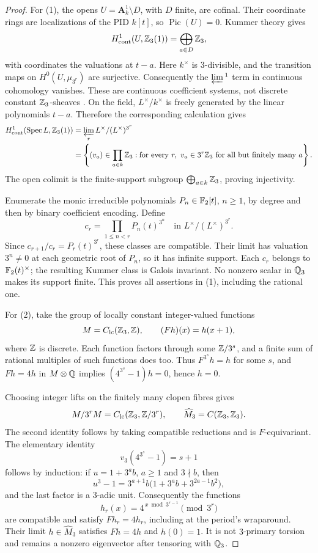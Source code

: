 \begin{proof}
For (1), the opens \(U=\mathbf A^1_k\setminus D\), with \(D\) finite,
are cofinal.  Their coordinate rings are localizations of the PID
\(k[t]\), so \(\operatorname{Pic}(U)=0\).  Kummer theory gives
\[
 H^1_{\mathrm{cont}}(U,\mathbb Z_3(1))
   =\bigoplus_{a\in D}\mathbb Z_3,
\]
with coordinates the valuations at \(t-a\).  Here \(k^\times\) is
\(3\)-divisible, and the transition maps on
\(H^0(U,\mu_{3^r})\) are surjective.  Consequently the
\(\varprojlim{}^1\) term in continuous cohomology vanishes.  These are
continuous coefficient systems, not discrete constant
\(\mathbb Z_3\)-sheaves
\cite[(3.1), Theorem~3.2 and (3.27), pp.~216--217, 222]{BJannsen1988}.
On the field, \(L^\times/k^\times\) is freely generated by the linear
polynomials \(t-a\).  Therefore the corresponding calculation gives
\[
\begin{split}
 H^1_{\mathrm{cont}}(\operatorname{Spec} L,\mathbb Z_3(1))
 &=\varprojlim_r L^\times/(L^\times)^{3^r}\\
 &=\left\{(v_a)\in\prod_{a\in k}\mathbb Z_3:
       \text{for every }r,\ v_a\in3^r\mathbb Z_3
       \text{ for all but finitely many }a\right\}.
\end{split}
\]
The open colimit is the finite-support subgroup
\(\bigoplus_{a\in k}\mathbb Z_3\), proving injectivity.

Enumerate the monic irreducible polynomials \(P_n\in\mathbb F_2[t]\),
\(n\geq1\), by degree and then by binary coefficient encoding.  Define
\[
 c_r=\prod_{1\leq n<r}P_n(t)^{3^n}
       \quad\text{in }L^\times/(L^\times)^{3^r}.
\]
Since \(c_{r+1}/c_r=P_r(t)^{3^r}\), these classes are compatible.
Their limit has valuation \(3^n\ne0\) at each geometric root of
\(P_n\), so it has infinite support.  Each \(c_r\) belongs to
\(\mathbb F_2(t)^\times\); the resulting Kummer class is Galois invariant.
No nonzero scalar in \(\mathbb Q_3\) makes its support finite.  This proves
all assertions in (1), including the rational one.

For (2), take the group of locally constant integer-valued functions
\[
 M=C_{\mathrm{lc}}(\mathbb Z_3,\mathbb Z),\qquad (Fh)(x)=h(x+1),
\]
where \(\mathbb Z\) is discrete.  Each function factors through some
\(\mathbb Z/3^s\), and a finite sum of rational multiples of such functions
does too.  Thus \(F^{3^s}h=h\) for some \(s\), and
\(Fh=4h\) in \(M\otimes\mathbb Q\) implies
\((4^{3^s}-1)h=0\), hence \(h=0\).

Choosing integer lifts on the finitely many clopen fibres gives
\[
 M/3^rM=C_{\mathrm{lc}}(\mathbb Z_3,\mathbb Z/3^r),\qquad
 \widehat M_3=C(\mathbb Z_3,\mathbb Z_3).
\]
The second identity follows by taking compatible reductions and is
\(F\)-equivariant.  The elementary identity
\[
 v_3(4^{3^s}-1)=s+1
\]
follows by induction: if \(u=1+3^a b\), \(a\geq1\) and \(3\nmid b\),
then
\[
 u^3-1=3^{a+1}b\bigl(1+3^a b+3^{2a-1}b^2\bigr),
\]
and the last factor is a \(3\)-adic unit.  Consequently the functions
\[
 h_r(x)=4^{\,x\bmod 3^{r-1}}\pmod{3^r}
\]
are compatible and satisfy \(Fh_r=4h_r\), including at the period's
wraparound.  Their limit \(h\in\widehat M_3\) satisfies
\(Fh=4h\) and \(h(0)=1\).  It is not \(3\)-primary torsion and
remains a nonzero eigenvector after tensoring with \(\mathbb Q_3\).
\end{proof}

